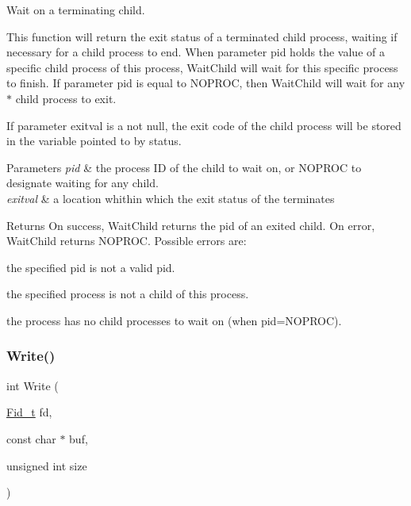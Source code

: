 Wait on a terminating child. 

This function will return the exit status of a terminated child process, waiting if necessary for a child process to end. When parameter {\ttfamily pid} holds the value of a specific child process of this process, {\ttfamily Wait\+Child} will wait for this specific process to finish. If parameter {\ttfamily pid} is equal to {\ttfamily N\+O\+P\+R\+OC}, then {\ttfamily Wait\+Child} will wait for any$\ast$ child process to exit.

If parameter {\ttfamily exitval} is a not null, the exit code of the child process will be stored in the variable pointed to by status.


\begin{DoxyParams}{Parameters}
{\em pid} & the process ID of the child to wait on, or {\ttfamily N\+O\+P\+R\+OC} to designate waiting for any child. \\
\hline
{\em exitval} & a location whithin which the exit status of the terminates \\
\hline
\end{DoxyParams}
\begin{DoxyReturn}{Returns}
On success, {\ttfamily Wait\+Child} returns the pid of an exited child. On error, Wait\+Child returns {\ttfamily N\+O\+P\+R\+OC}. Possible errors are\+:
\begin{DoxyItemize}
\item the specified pid is not a valid pid.
\item the specified process is not a child of this process.
\item the process has no child processes to wait on (when pid=N\+O\+P\+R\+OC). 
\end{DoxyItemize}
\end{DoxyReturn}
\mbox{\label{group__syscalls_gaf046f003fde24f79fb395c250137856c}} 
\subsubsection{\texorpdfstring{Write()}{Write()}}
{\footnotesize\ttfamily int Write (\begin{DoxyParamCaption}\item[{\hyperlink{group__syscalls_ga5097222c5f0da97d92d4712359abc38f}{Fid\+\_\+t}}]{fd,  }\item[{const char $\ast$}]{buf,  }\item[{unsigned int}]{size }\end{DoxyParamCaption})}




